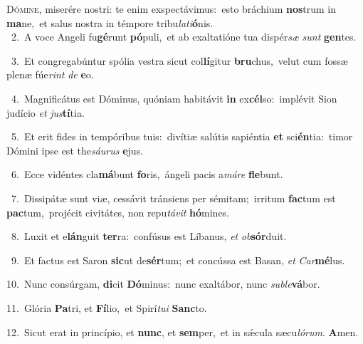 \lettrine{\initial\textcolor{\initialcolor}{D}}{ómine,} miserére nostri: te enim exspectávimus:~\dagger esto bráchium \textbf{nos}\-trum in \textbf{ma}\-ne,~\star et salus nostra in témpore tribu\-\textit{la}\-\textit{ti}\textbf{ó}nis.\\
{\numbfont\textcolor{\numbcolor}{~2.}}~A voce Angeli fu\-\textbf{gé}\-runt \textbf{pó}\-puli,~\star et ab exaltatióne tua dispér\textit{sæ} \textit{sunt} \textbf{gen}\-tes.\par
{\numbfont\textcolor{\numbcolor}{~3.}}~Et congregabúntur spólia vestra sicut col\-\textbf{lí}\-gitur \textbf{bru}\-chus,~\star velut cum fossæ plenæ fúe\textit{rint} \textit{de} \textbf{e}\-o.\par
{\numbfont\textcolor{\numbcolor}{~4.}}~Magnificátus est Dóminus, quóniam habitávit \textbf{in} ex\-\textbf{cél}\-so:~\star implévit Sion judício \textit{et} \textit{jus}\-\textbf{tí}tia.\par
{\numbfont\textcolor{\numbcolor}{~5.}}~Et erit fides in tempóribus tuis:~\dagger divítiæ salútis sapiéntia \textbf{et} sci\-\textbf{én}\-tia:~\star timor Dómini ipse est the\-\textit{sáu}\-\textit{rus} \textbf{e}\-jus.\par
{\numbfont\textcolor{\numbcolor}{~6.}}~Ecce vidéntes cla\-\textbf{má}\-bunt \textbf{fo}\-ris,~\star ángeli pacis a\-\textit{má}\-\textit{re} \textbf{fle}\-bunt.\par
{\numbfont\textcolor{\numbcolor}{~7.}}~Dissipátæ sunt viæ, cessávit tránsiens per sémitam;~\dagger irritum \textbf{fac}\-tum est \textbf{pac}\-tum,~\star projécit civitátes, non repu\-\textit{tá}\-\textit{vit} \textbf{hó}\-mines.\par
{\numbfont\textcolor{\numbcolor}{~8.}}~Luxit et e\-\textbf{lán}\-guit \textbf{ter}\-ra:~\star confúsus est Líbanus, \textit{et} \textit{ob}\-\textbf{sór}duit.\par
{\numbfont\textcolor{\numbcolor}{~9.}}~Et factus est Saron \textbf{sic}\-ut de\-\textbf{sér}\-tum;~\star et concússa est Basan, \textit{et} \textit{Car}\-\textbf{mé}lus.\par
{\numbfont\textcolor{\numbcolor}{10.}}~Nunc consúrgam, \textbf{di}\-cit \textbf{Dó}\-minus:~\star nunc exaltábor, nunc \textit{sub}\-\textit{le}\textbf{vá}bor.\par
{\numbfont\textcolor{\numbcolor}{11.}}~Glória \textbf{Pa}\-tri, et \textbf{Fí}\-lio,~\star et Spirí\-\textit{tu}\-\textit{i} \textbf{Sanc}\-to.\par
{\numbfont\textcolor{\numbcolor}{12.}}~Sicut erat in princípio, et \textbf{nunc}\-, et \textbf{sem}\-per,~\star et in sǽcula sæcu\-\textit{ló}\-\textit{rum}. \textbf{A}\-men.\par
